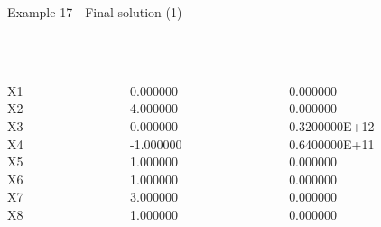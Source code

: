 \begin{frame}{Example 17 - Final solution (1)}
\footnotesize
{} \\
  \\

\begin{columns}[t]
\begin{column}{0.3\textwidth}
\\
X1\\
X2\\
X3\\
X4\\
X5\\
X6\\
X7\\
X8\\
\end{column}
\begin{column}{0.3\textwidth}
\\
0.000000\\
4.000000\\
0.000000\\
-1.000000\\
1.000000\\
1.000000\\
3.000000\\
1.000000\\
\end{column}

\begin{column}{0.3\textwidth}
\\
0.000000\\
0.000000\\
0.3200000E+12\\
0.6400000E+11\\
0.000000\\
0.000000\\
0.000000\\
0.000000\\
\end{column}
\end{columns}
\end{frame}


